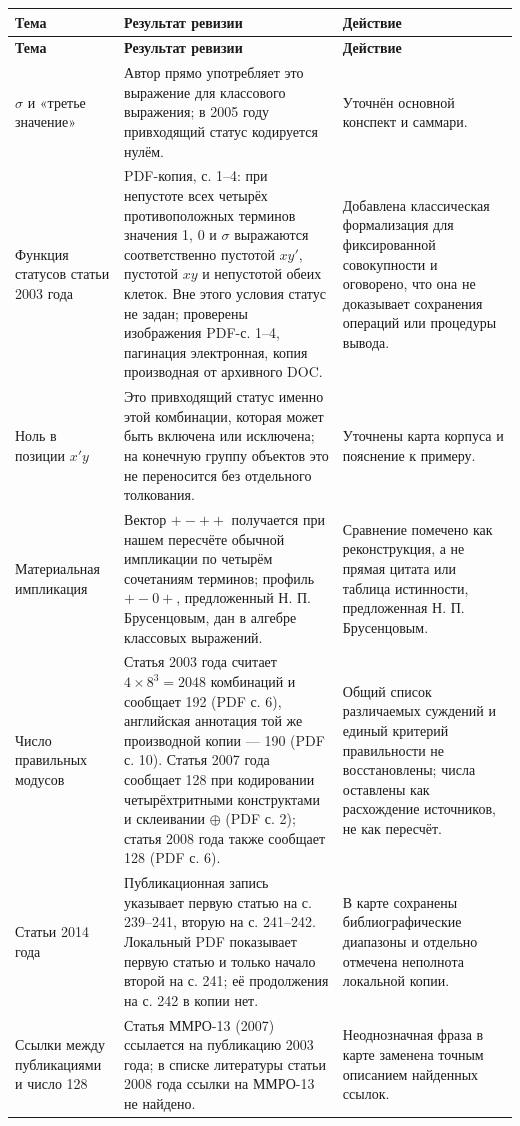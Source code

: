 \documentclass[12pt,a4paper]{article}
\begin{document}
\begin{longtable}{P{0.260\textwidth}P{0.300\textwidth}P{0.360\textwidth}}
\toprule
\textbf{Тема} & \textbf{Результат ревизии} & \textbf{Действие} \\
\midrule
\endfirsthead
\toprule
\textbf{Тема} & \textbf{Результат ревизии} & \textbf{Действие} \\
\midrule
\endhead
\(\sigma\) и «третье значение» & Автор прямо употребляет это выражение для классового выражения; в 2005 году привходящий статус кодируется нулём. & Уточнён основной конспект и саммари. \\
Функция статусов статьи 2003 года & PDF-копия, с. 1–4: при непустоте всех четырёх противоположных терминов значения 1, 0 и \(\sigma\) выражаются соответственно пустотой \(xy'\), пустотой \(xy\) и непустотой обеих клеток. Вне этого условия статус не задан; проверены изображения PDF-с. 1–4, пагинация электронная, копия производная от архивного DOC. & Добавлена классическая формализация для фиксированной совокупности и оговорено, что она не доказывает сохранения операций или процедуры вывода. \\
Ноль в позиции \(x'y\) & Это привходящий статус именно этой комбинации, которая может быть включена или исключена; на конечную группу объектов это не переносится без отдельного толкования. & Уточнены карта корпуса и пояснение к примеру. \\
Материальная импликация & Вектор \(+-++\) получается при нашем пересчёте обычной импликации по четырём сочетаниям терминов; профиль \(+-0+\), предложенный Н. П. Брусенцовым, дан в алгебре классовых выражений. & Сравнение помечено как реконструкция, а не прямая цитата или таблица истинности, предложенная Н. П. Брусенцовым. \\
Число правильных модусов & Статья 2003 года считает \(4\times8^3=2048\) комбинаций и сообщает 192 (PDF с. 6), английская аннотация той же производной копии — 190 (PDF с. 10). Статья 2007 года сообщает 128 при кодировании четырёхтритными конструктами и склеивании \(\oplus\) (PDF с. 2); статья 2008 года также сообщает 128 (PDF с. 6). & Общий список различаемых суждений и единый критерий правильности не восстановлены; числа оставлены как расхождение источников, не как пересчёт. \\
Статьи 2014 года & Публикационная запись указывает первую статью на с. 239–241, вторую на с. 241–242. Локальный PDF показывает первую статью и только начало второй на с. 241; её продолжения на с. 242 в копии нет. & В карте сохранены библиографические диапазоны и отдельно отмечена неполнота локальной копии. \\
Ссылки между публикациями и число 128 & Статья ММРО-13 (2007) ссылается на публикацию 2003 года; в списке литературы статьи 2008 года ссылки на ММРО-13 не найдено. & Неоднозначная фраза в карте заменена точным описанием найденных ссылок. \\
\bottomrule
\end{longtable}
\end{document}
